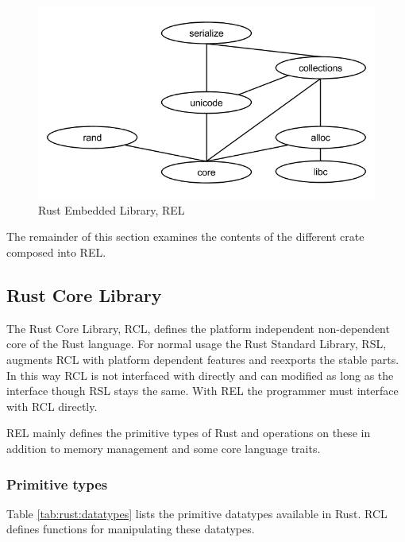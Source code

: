 \begin{figure}[H]
  \begin{center}
    \includegraphics[scale=0.3]{figures/background/rust/embedded-rust-lib.png}
  \end{center}
  \caption{Rust Embedded Library, REL}
  \label{fig:rust:rel}
\end{figure}

The remainder of this section examines the contents of the different crate composed into REL.

\subsection{Rust Core Library}

The Rust Core Library, RCL, defines the platform independent non-dependent core of the Rust language.
For normal usage the Rust Standard Library, RSL, augments RCL with platform dependent features and reexports the stable parts.
In this way RCL is not interfaced with directly and can modified as long as the interface though RSL stays the same.
With REL the programmer must interface with RCL directly.

REL mainly defines the primitive types of Rust and operations on these in addition to memory management and some core language traits.

\subsubsection{Primitive types}

Table \ref{tab:rust:datatypes} lists the primitive datatypes available in Rust.
RCL defines functions for manipulating these datatypes.

